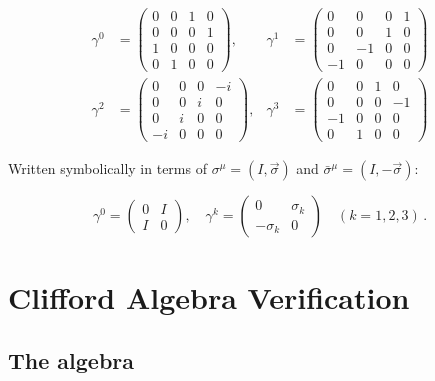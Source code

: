 \documentclass[12pt]{article}
\begin{document}
\begin{align}
  \gamma^0 &= \begin{pmatrix}0 & 0 & 1 & 0 \\ 0 & 0 & 0 & 1 \\ 1 & 0 & 0 & 0 \\ 0 & 1 & 0 & 0\end{pmatrix},&
  \gamma^1 &= \begin{pmatrix}0 & 0 & 0 & 1 \\ 0 & 0 & 1 & 0 \\ 0 & -1 & 0 & 0 \\ -1 & 0 & 0 & 0\end{pmatrix}\\[6pt]
  \gamma^2 &= \begin{pmatrix}0 & 0 & 0 & -i \\ 0 & 0 & i & 0 \\ 0 & i & 0 & 0 \\ -i & 0 & 0 & 0\end{pmatrix},&
  \gamma^3 &= \begin{pmatrix}0 & 0 & 1 & 0 \\ 0 & 0 & 0 & -1 \\ -1 & 0 & 0 & 0 \\ 0 & 1 & 0 & 0\end{pmatrix}
\end{align}

\noindent Written symbolically in terms of $\sigma^\mu = (I, \vec{\sigma})$
and $\bar{\sigma}^\mu = (I,-\vec{\sigma})$:

\[
  \gamma^0 = \begin{pmatrix}0&I\\I&0\end{pmatrix},\quad
  \gamma^k = \begin{pmatrix}0&\sigma_k\\-\sigma_k&0\end{pmatrix}
  \quad (k=1,2,3)\,.
\]

\section{Clifford Algebra Verification}

\subsection{The algebra}
\end{document}

